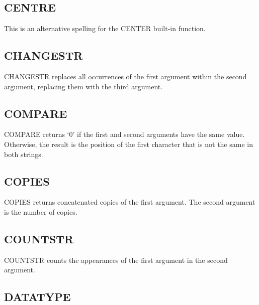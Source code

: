 \subsection{CENTRE}\label{centre}

This is an alternative spelling for the CENTER built-in function.

\subsection{CHANGESTR}\label{changestr}

CHANGESTR replaces all occurrences of the first argument within the
second argument, replacing them with the third argument.



\subsection{COMPARE}\label{compare}

COMPARE returns `0' if the first and second arguments have the same
value. Otherwise, the result is the position of the first character that
is not the same in both strings.



\subsection{COPIES}\label{copies}

COPIES returns concatenated copies of the first argument. The second
argument is the number of copies.



\subsection{COUNTSTR}\label{countstr}

COUNTSTR counts the appearances of the first argument in the second
argument.



\subsection{DATATYPE}\label{datatype}

